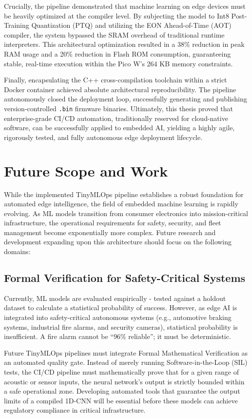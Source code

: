 \documentclass[11pt,a4paper,openany]{book}
\begin{document}
Crucially, the pipeline demonstrated that machine learning on edge devices must be heavily optimized at the compiler level. By subjecting the model to Int8 Post-Training Quantization (PTQ) and utilizing the EON Ahead-of-Time (AOT) compiler, the system bypassed the SRAM overhead of traditional runtime interpreters. This architectural optimization resulted in a 38\% reduction in peak RAM usage and a 20\% reduction in Flash ROM consumption, guaranteeing stable, real-time execution within the Pico W's 264 KB memory constraints.

Finally, encapsulating the C++ cross-compilation toolchain within a strict Docker container achieved absolute architectural reproducibility. The pipeline autonomously closed the deployment loop, successfully generating and publishing version-controlled \texttt{.bin} firmware binaries. Ultimately, this thesis proved that enterprise-grade CI/CD automation, traditionally reserved for cloud-native software, can be successfully applied to embedded AI, yielding a highly agile, rigorously tested, and fully autonomous edge deployment lifecycle.

\section{Future Scope and Work}
While the implemented TinyMLOps pipeline establishes a robust foundation for automated edge intelligence, the field of embedded machine learning is rapidly evolving. As ML models transition from consumer electronics into mission-critical infrastructure, the operational requirements for safety, security, and fleet management become exponentially more complex. Future research and development expanding upon this architecture should focus on the following domains:

\subsection{Formal Verification for Safety-Critical Systems}
Currently, ML models are evaluated empirically - tested against a holdout dataset to calculate a statistical probability of success. However, as edge AI is integrated into safety-critical autonomous systems (e.g., automotive braking systems, industrial fire alarms, and security cameras), statistical probability is insufficient. A fire alarm cannot be ``96\% reliable''; it must be deterministic.

Future TinyMLOps pipelines must integrate Formal Mathematical Verification as an automated quality gate. Instead of merely running Software-in-the-Loop (SIL) tests, the CI/CD pipeline must mathematically prove that for a given range of acoustic or sensor inputs, the neural network's output is strictly bounded within a safe operational zone. Developing automated tools that guarantee the output limits of a compiled 1D-CNN will be essential before these models can achieve regulatory compliance in critical infrastructure.
\end{document}
